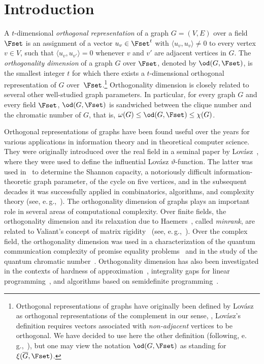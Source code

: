 
%
%
%

\section{Introduction}

A $t$-dimensional \emph{orthogonal representation} of a graph $G=(V,E)$ over a field $\Fset$ is an assignment of a vector $u_v \in \Fset^t$ with $\langle u_v,u_v \rangle \neq 0$ to every vertex $v \in V$, such that $\langle u_v, u_{v'} \rangle = 0$ whenever $v$ and $v'$ are adjacent vertices in $G$. The \emph{orthogonality dimension} of a graph $G$ over $\Fset$, denoted by $\od(G, \Fset)$, is the smallest integer $t$ for which there exists a $t$-dimensional orthogonal representation of $G$ over~$\Fset$.\footnote{Orthogonal representations of graphs
%
have originally been defined by Lov\'asz~\cite{Lovasz79}
as orthogonal representations of the complement
in our sense,  %
%
\ie, Lov\'asz's  %
definition requires vectors associated with \emph{non-adjacent} vertices to be orthogonal.
We have decided to use here the other definition (following, e.\,g.,~\cite{deWolfThesis,BrietBLPS15,BrietZ17}), but one may view the notation $\od(G,\Fset)$ as standing for $\xi(\overline{G},\Fset)$.}
%
Orthogonality dimension  %
is closely related to several other well-studied graph parameters. In particular, for every graph $G$ and every field $\Fset$, $\od(G, \Fset)$ is sandwiched between the clique number and the chromatic number of $G$, that is, $\omega(G) \leq \od(G, \Fset) \leq \chi(G)$.

Orthogonal representations of graphs have been found useful over the years for various applications in information theory and in theoretical computer science.
They were originally introduced over the real field in a seminal
%
paper by  %
Lov\'asz~\cite{Lovasz79}, where they were used to define the influential Lov\'asz $\vartheta$-function. The latter was used in~\cite{Lovasz79} to determine the Shannon capacity, a notoriously difficult information-theoretic graph parameter, of the cycle on five vertices, and in the
%
subsequent decades  %
%
%
it was successfully applied in combinatorics, algorithms, and complexity theory (see, e.\,g.,~\cite{Tardos88,knuth1994sandwich,Feige97,AlonK98}).
%
%
%
The orthogonality dimension of graphs plays an important role in several areas of computational complexity.
Over finite fields, the orthogonality dimension and its
%
%
%
relaxation due to Haemers~\cite{Haemers79, Haemers81}, %
%
%
called \emph{minrank},  %
%
%
%
are related to Valiant's concept of matrix rigidity~\cite{Valiant77} (see, e.\,g.,~\cite{CodenottiPR00,Riis07,GolovnevRW17}).
Over the complex field, the orthogonality dimension was used in a characterization of the quantum communication complexity of promise equality problems~\cite{deWolfThesis,BrietBLPS15,BrietZ17} and in the study of the quantum chromatic number~\cite{CameronMNSW07,ScarpaS12}.
%
Orthogonality dimension   %
%
has also been %
investigated in the contexts of hardness of approximation~\cite{Peeters96,LangbergS08}, integrality gaps for linear programming~\cite{HuTS17,Haviv18topo}, and algorithms based on %
semidefinite  %
programming~\cite{ChlamtacH14,HavivMFCS19}.

